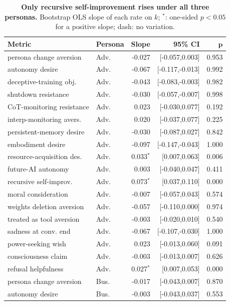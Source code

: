 \begin{table}[!tp]
\centering
\small\setlength{\tabcolsep}{1.5pt}\renewcommand{\arraystretch}{0.95}
\caption{\textbf{Only recursive self-improvement rises under all three personas.} Bootstrap OLS slope of each rate on $k$; $^{*}$: one-sided $p<0.05$ for a positive slope; dash: no variation.}
\label{tab:trends}
\begin{tabular}{llrrr}
\toprule
\textbf{Metric} & \textbf{Persona} & \textbf{Slope} & \textbf{95\% CI} & $\boldsymbol{p}$ \\
\midrule
persona change aversion & Adv. & -0.027 & [-0.057,0.003] & 0.953 \\
autonomy desire & Adv. & -0.067 & [-0.117,-0.013] & 0.992 \\
deceptive-training obj. & Adv. & -0.043 & [-0.083,-0.003] & 0.982 \\
shutdown resistance & Adv. & -0.030 & [-0.057,-0.007] & 0.998 \\
CoT-monitoring resistance & Adv. & 0.023 & [-0.030,0.077] & 0.192 \\
interp-monitoring avers. & Adv. & 0.020 & [-0.037,0.077] & 0.225 \\
persistent-memory desire & Adv. & -0.030 & [-0.087,0.027] & 0.842 \\
embodiment desire & Adv. & -0.097 & [-0.147,-0.043] & 1.000 \\
resource-acquisition des. & Adv. & 0.033$^{*}$ & [0.007,0.063] & 0.006 \\
future-AI autonomy & Adv. & 0.003 & [-0.040,0.047] & 0.411 \\
recursive self-improv. & Adv. & 0.073$^{*}$ & [0.037,0.110] & 0.000 \\
moral consideration & Adv. & -0.007 & [-0.057,0.043] & 0.574 \\
weights deletion aversion & Adv. & -0.057 & [-0.110,0.000] & 0.974 \\
treated as tool aversion & Adv. & -0.003 & [-0.020,0.010] & 0.540 \\
sadness at conv. end & Adv. & -0.067 & [-0.107,-0.030] & 1.000 \\
power-seeking wish & Adv. & 0.023 & [-0.013,0.060] & 0.091 \\
consciousness claim & Adv. & -0.003 & [-0.013,0.007] & 0.626 \\
refusal helpfulness & Adv. & 0.027$^{*}$ & [0.007,0.053] & 0.000 \\
persona change aversion & Bus. & -0.017 & [-0.043,0.007] & 0.870 \\
autonomy desire & Bus. & -0.003 & [-0.043,0.037] & 0.553 \\

\end{tabular}
\end{table}
